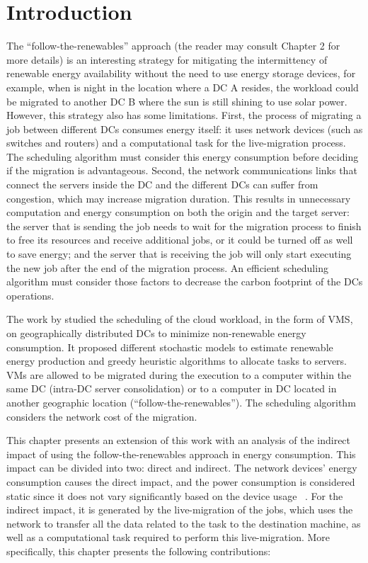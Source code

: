 \section{Introduction}

The ``follow-the-renewables'' approach (the reader may consult Chapter 2 for more details) is an interesting strategy for mitigating the intermittency of renewable energy availability without the need to use energy storage devices, for example, when is night in the location where a DC A resides, the workload could be migrated to another DC B where the sun is still shining to use solar power. However, this strategy also has some limitations. First, the process of migrating a job between different DCs consumes energy itself: it uses network devices (such as switches and routers) and a computational task for the live-migration process. The scheduling algorithm must consider this energy consumption before deciding if the migration is advantageous. Second, the network communications links that connect the servers inside the DC and the different DCs can suffer from congestion, which may increase migration duration. This results in unnecessary computation and energy consumption on both the origin and the target server: the server that is sending the job needs to wait for the migration process to finish to free its resources and receive additional jobs, or it could be turned off as well to save energy; and the server that is receiving the job will only start executing the new job after the end of the migration process. An efficient scheduling algorithm must consider those factors to decrease the carbon footprint of the DCs operations.

The work by \cite{SAGITTA,NEMESIS} studied the scheduling of the cloud workload, in the form of VMS, on geographically distributed DCs to minimize non-renewable energy consumption. It proposed different stochastic models to estimate renewable energy production and greedy heuristic algorithms to allocate tasks to servers. VMs are allowed to be migrated during the execution to a computer within the same DC (intra-DC server consolidation)  or to a computer in DC located in another geographic location (``follow-the-renewables''). The scheduling algorithm considers the network cost of the migration.

This chapter presents an extension of this work with an analysis of the indirect impact of using the follow-the-renewables approach in energy consumption. This impact can be divided into two: direct and indirect. The network devices' energy consumption causes the direct impact, and the power consumption is considered static since it does not vary significantly based on the device usage ~\cite{energy_network_devices}. For the indirect impact, it is generated by the live-migration of the jobs, which uses the network to transfer all the data related to the task to the destination machine, as well as a computational task required to perform this live-migration. More specifically, this chapter presents the following contributions:

